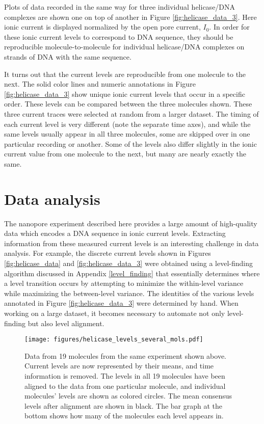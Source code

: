 Plots of data recorded in the same way for three individual helicase/DNA complexes are shown one on top of another in Figure \ref{fig:helicase_data_3}.  Here ionic current is displayed normalized by the open pore current, $I_0$.  In order for these ionic current levels to correspond to DNA sequence, they should be reproducible molecule-to-molecule for individual helicase/DNA complexes on strands of DNA with the same sequence.

It turns out that the current levels are reproducible from one molecule to the next.  The solid color lines and numeric annotations in Figure \ref{fig:helicase_data_3} show unique ionic current levels that occur in a specific order.  These levels can be compared between the three molecules shown.  These three current traces were selected at random from a larger dataset.  The timing of each current level is very different (note the separate time axes), and while the same levels usually appear in all three molecules, some are skipped over in one particular recording or another.  Some of the levels also differ slightly in the ionic current value from one molecule to the next, but many are nearly exactly the same.

\section{Data analysis}

The nanopore experiment described here provides a large amount of high-quality data which encodes a DNA sequence in ionic current levels.  Extracting information from these measured current levels is an interesting challenge in data analysis.  For example, the discrete current levels shown in Figures \ref{fig:helicase_data} and \ref{fig:helicase_data_3} were obtained using a level-finding algorithm discussed in Appendix \ref{level_finding} that essentially determines where a level transition occurs by attempting to minimize the within-level variance while maximizing the between-level variance.  The identities of the various levels annotated in Figure \ref{fig:helicase_data_3} were determined by hand.  When working on a large dataset, it becomes necessary to automate not only level-finding but also level alignment.

\begin{figure}[h]
\begin{centering}
\texttt{[image: figures/helicase\_levels\_several\_mols.pdf]}
\caption[Current levels are reproducible molecule to molecule]{Data from 19 molecules from the same experiment shown above.  Current levels are now represented by their means, and time information is removed.  The levels in all 19 molecules have been aligned to the data from one particular molecule, and individual molecules' levels are shown as colored circles.  The mean consensus levels after alignment are shown in black.  The bar graph at the bottom shows how many of the molecules each level appears in.}
\label{fig:helicase_data_aligned}
\end{centering}
\end{figure}

